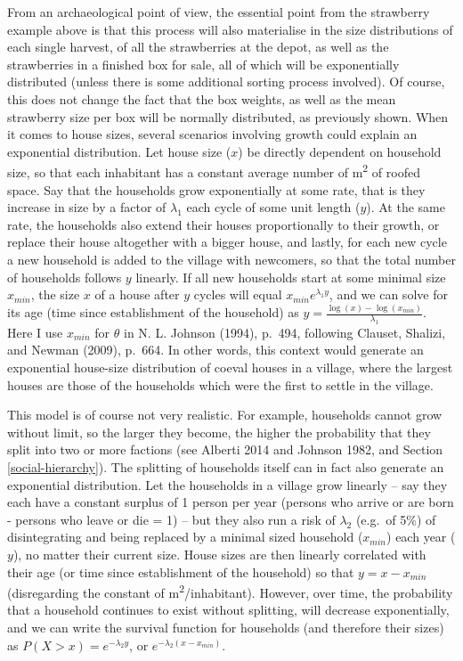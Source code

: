 \documentclass[
  12pt,
  a4paper, twoside]{book}
\begin{document}
From an archaeological point of view, the essential point from the strawberry example above is that this process will also materialise in the size distributions of each single harvest, of all the strawberries at the depot, as well as the strawberries in a finished box for sale, all of which will be exponentially distributed (unless there is some additional sorting process involved). Of course, this does not change the fact that the box weights, as well as the mean strawberry size per box will be normally distributed, as previously shown. When it comes to house sizes, several scenarios involving growth could explain an exponential distribution. Let house size (\(x\)) be directly dependent on household size, so that each inhabitant has a constant average number of m\textsuperscript{2} of roofed space. Say that the households grow exponentially at some rate, that is they increase in size by a factor of \(\lambda_1\) each cycle of some unit length (\(y\)). At the same rate, the households also extend their houses proportionally to their growth, or replace their house altogether with a bigger house, and lastly, for each new cycle a new household is added to the village with newcomers, so that the total number of households follows \(y\) linearly. If all new households start at some minimal size \(x_{min}\), the size \(x\) of a house after \(y\) cycles will equal \(x_{min}e^{\lambda_1 y}\), and we can solve for its age (time since establishment of the household) as \(y = \frac{\log(x)-\log(x_{min})}{\lambda_1}\). Here I use \(x_{min}\) for \(\theta\) in N. L. Johnson (1994), p.~494, following Clauset, Shalizi, and Newman (2009), p.~664. In other words, this context would generate an exponential house-size distribution of coeval houses in a village, where the largest houses are those of the households which were the first to settle in the village.

This model is of course not very realistic. For example, households cannot grow without limit, so the larger they become, the higher the probability that they split into two or more factions (see Alberti 2014 and Johnson 1982, and Section \ref{social-hierarchy}). The splitting of households itself can in fact also generate an exponential distribution. Let the households in a village grow linearly -- say they each have a constant surplus of 1 person per year (persons who arrive or are born - persons who leave or die = 1) -- but they also run a risk of \(\lambda_2\) (e.g.~of 5\%) of disintegrating and being replaced by a minimal sized household (\(x_{min}\)) each year (\(y\)), no matter their current size. House sizes are then linearly correlated with their age (or time since establishment of the household) so that \(y = x - x_{min}\) (disregarding the constant of m\textsuperscript{2}/inhabitant). However, over time, the probability that a household continues to exist without splitting, will decrease exponentially, and we can write the survival function for households (and therefore their sizes) as \(P(X > x) = e^{-\lambda_2 y}\), or \(e^{-\lambda_2 (x-x_{min})}\).
\end{document}
